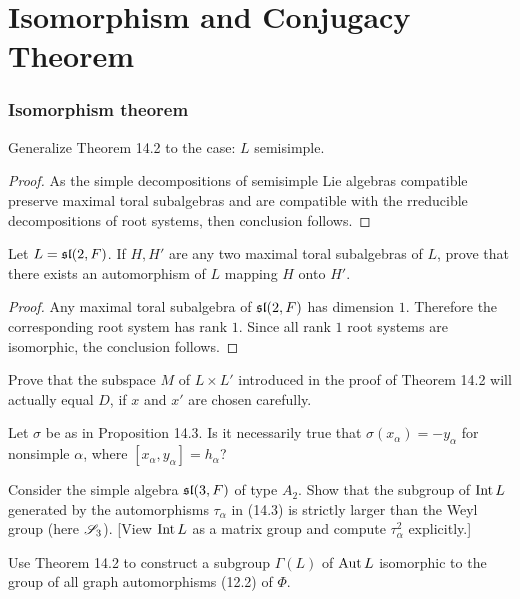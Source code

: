 \part{Isomorphism and Conjugacy Theorem}
\section{Isomorphism theorem}

\begin{ex}
  Generalize Theorem 14.2 to the case: $L$ semisimple.
\end{ex}
\begin{proof}
	As the simple decompositions of semisimple Lie algebras compatible preserve maximal toral subalgebras and are compatible with the rreducible decompositions of root systems, then conclusion follows.
\end{proof}

\begin{ex}
  Let $L = \sl(2, F)$. If $H,H'$ are any two maximal toral subalgebras of $L$, prove that there exists an automorphism of $L$ mapping $H$ onto $H'$.
\end{ex}
\begin{proof}
	Any maximal toral subalgebra of $\sl(2, F)$ has dimension $1$. Therefore the corresponding root system has rank $1$. Since all rank $1$ root systems are isomorphic, the conclusion follows.
\end{proof}

\begin{ex}
  Prove that the subspace $M$ of $L \times L'$ introduced in the proof of Theorem 14.2 will actually equal $D$, if $x$ and $x'$ are chosen carefully.
\end{ex}

\begin{ex}
  Let $\sigma$ be as in Proposition 14.3. Is it necessarily true that $\sigma(x_{\alpha}) = -y_{\alpha}$ for nonsimple $\alpha$, where $[x_{\alpha},y_{\alpha}] = h_{\alpha}$?
\end{ex}

\begin{ex}
  Consider the simple algebra $\sl(3,F)$ of type $A_2$. Show that the subgroup of $\Int L$ generated by the automorphisms $\tau_{\alpha}$ in (14.3) is strictly larger than the Weyl group (here $\Sss_3$). [View $\Int L$ as a matrix group and compute $\tau_{\alpha}^2$ explicitly.]
\end{ex}

\begin{ex}
  Use Theorem 14.2 to construct a subgroup $\Gamma(L)$ of $\Aut L$ isomorphic to the group of all graph automorphisms (12.2) of $\Phi$.
\end{ex}

